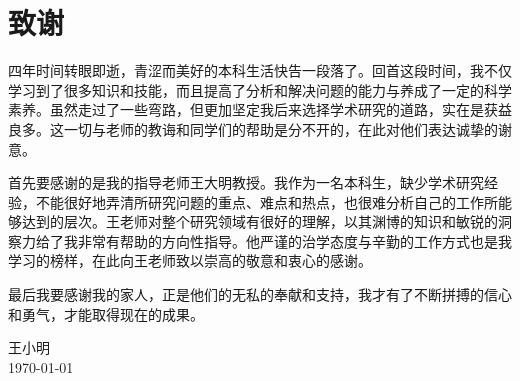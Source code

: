 
\chapter{致谢}

四年时间转眼即逝，青涩而美好的本科生活快告一段落了。回首这段时间，我不仅学习到了很多知识和技能，而且提高了分析和解决问题的能力与养成了一定的科学素养。虽然走过了一些弯路，但更加坚定我后来选择学术研究的道路，实在是获益良多。这一切与老师的教诲和同学们的帮助是分不开的，在此对他们表达诚挚的谢意。

首先要感谢的是我的指导老师王大明教授。我作为一名本科生，缺少学术研究经验，不能很好地弄清所研究问题的重点、难点和热点，也很难分析自己的工作所能够达到的层次。王老师对整个研究领域有很好的理解，以其渊博的知识和敏锐的洞察力给了我非常有帮助的方向性指导。他严谨的治学态度与辛勤的工作方式也是我学习的榜样，在此向王老师致以崇高的敬意和衷心的感谢。

最后我要感谢我的家人，正是他们的无私的奉献和支持，我才有了不断拼搏的信心和勇气，才能取得现在的成果。

\vskip 108pt
\begin{flushright}
	王小明\makebox[1cm]{} \\
	\today
\end{flushright}

